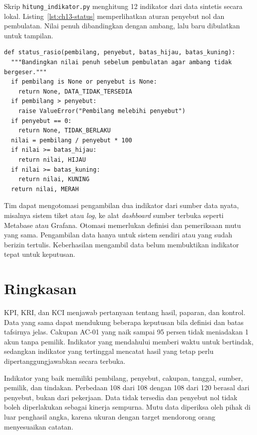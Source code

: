 \begin{pendalaman}
Skrip \texttt{hitung\_indikator.py} menghitung 12 indikator dari data sintetis secara lokal.
Listing~\ref{lst:ch13-status} memperlihatkan aturan penyebut nol dan pembulatan. Nilai penuh
dibandingkan dengan ambang, lalu baru dibulatkan untuk tampilan.

\begin{lstlisting}[basicstyle=\ttfamily\scriptsize,columns=fullflexible,frame=lines,breaklines=true,
  caption={Status rasio, tersedia di \berkas{sources/chapter13/hitung_indikator.py}},
  label={lst:ch13-status}]
def status_rasio(pembilang, penyebut, batas_hijau, batas_kuning):
  """Bandingkan nilai penuh sebelum pembulatan agar ambang tidak bergeser."""
  if pembilang is None or penyebut is None:
    return None, DATA_TIDAK_TERSEDIA
  if pembilang > penyebut:
    raise ValueError("Pembilang melebihi penyebut")
  if penyebut == 0:
    return None, TIDAK_BERLAKU
  nilai = pembilang / penyebut * 100
  if nilai >= batas_hijau:
    return nilai, HIJAU
  if nilai >= batas_kuning:
    return nilai, KUNING
  return nilai, MERAH
\end{lstlisting}

Tim dapat mengotomasi pengambilan dua indikator dari sumber data nyata, misalnya sistem tiket atau
\textit{log}, ke alat \textit{dashboard} sumber terbuka seperti Metabase atau Grafana. Otomasi
memerlukan definisi dan pemeriksaan mutu yang sama. Pengambilan data hanya untuk sistem sendiri atau
yang sudah berizin tertulis. Keberhasilan mengambil data belum membuktikan indikator tepat untuk
keputusan.
\end{pendalaman}

\section{Ringkasan}

KPI, KRI, dan KCI menjawab pertanyaan tentang hasil, paparan, dan kontrol. Data yang sama dapat
mendukung beberapa keputusan bila definisi dan batas tafsirnya jelas. Cakupan AC-01 yang naik sampai
95 persen tidak meniadakan 1 akun tanpa pemilik. Indikator yang mendahului memberi waktu untuk
bertindak, sedangkan indikator yang tertinggal mencatat hasil yang tetap perlu dipertanggungjawabkan
secara terbuka.

Indikator yang baik memiliki pembilang, penyebut, cakupan, tanggal, sumber, pemilik, dan tindakan.
Perbedaan 108 dari 108 dengan 108 dari 120 berasal dari penyebut, bukan dari pekerjaan. Data tidak
tersedia dan penyebut nol tidak boleh diperlakukan sebagai kinerja sempurna. Mutu data diperiksa
oleh pihak di luar penghasil angka, karena ukuran dengan target mendorong orang menyesuaikan
catatan.

